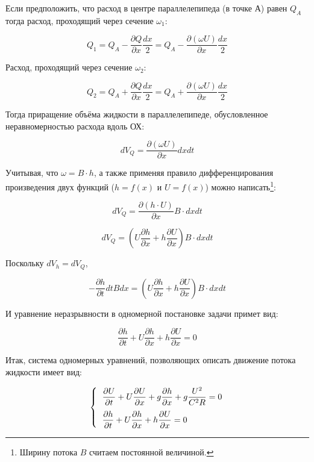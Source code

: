 Если предположить, что расход в центре параллелепипеда (в точке А) равен $ Q_A $ тогда расход, проходящий через сечение $ \omega_1 $:

$$
  \displaystyle Q_1 = Q_A - \frac{\partial Q}{\partial x} \frac{dx}{2} = Q_A - \frac{\partial (\omega U)}{\partial x} \frac{dx}{2}
$$

Расход, проходящий через сечение $ \omega_2 $:

$$
  \displaystyle Q_2 = Q_A + \frac{\partial Q}{\partial x} \frac{dx}{2} = Q_A + \frac{\partial (\omega U)}{\partial x} \frac{dx}{2}
$$

Тогда приращение объёма жидкости в параллелепипеде, обусловленное неравномерностью расхода вдоль ОХ:


$$
  \displaystyle dV_Q = \frac{\partial (\omega U)}{\partial x} dx dt
$$

Учитывая, что $ \omega = B \cdot h $, а также применяя правило дифференцирования произведения двух функций ($ h = f(x) $ и $ U = f(x) $) можно написать\footnote{Ширину потока $ B $ считаем постоянной величиной.}:

$$
  \displaystyle dV_Q = \frac{\partial (h \cdot U)}{\partial x} B \cdot dx dt
$$

$$
  \displaystyle dV_Q = \left( U \frac{\partial h}{\partial x} + h \frac{\partial U}{\partial x} \right)   B \cdot dx dt
$$


Поскольку $ dV_h = dV_Q $,

$$
  \displaystyle -\frac{\partial h}{\partial t} dt B dx = \left( U \frac{\partial h}{\partial x} + h \frac{\partial U}{\partial x} \right)   B \cdot dx dt
$$ 


И уравнение неразрывности в одномерной постановке задачи примет вид:

\begin{equation}
  \label{eq_urNerazr}
  \displaystyle \frac{\partial h}{\partial t} + U \frac{\partial h}{\partial x} + h \frac{\partial U}{\partial x} = 0
\end{equation}

\vspace{1.5cm}

Итак, система одномерных уравнений, позволяющих описать движение потока жидкости имеет вид:

\begin{equation}
  \label{eq_urMelk}
     \left\{
{\setlength\arraycolsep{2pt}
  \begin{array}{rl}
     \vspace{7pt}
    & \displaystyle \frac{\partial U}{\partial t} + U \frac{\partial U}{\partial x} + g \frac{ \partial h}{ \partial x} + g \frac{U^2}{C^2 R} = 0  \\
    & \displaystyle \frac{\partial h}{\partial t} + U \frac{\partial h}{\partial x} + h \frac{\partial U}{\partial x} = 0
  \end{array}
}
\right. 
\end{equation}

